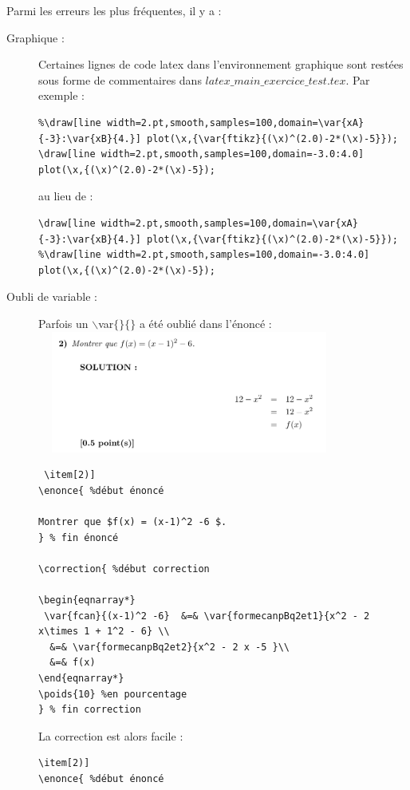 {Parmi les erreurs les plus fréquentes, il y a :

\begin{description}
 \item[Graphique : ] Certaines lignes de code latex dans l'environnement graphique sont restées sous forme de commentaires dans 
 {\bf $latex\_main\_exercice\_test.tex$}. Par exemple :
  \begin{verbatim}
%\draw[line width=2.pt,smooth,samples=100,domain=\var{xA}{-3}:\var{xB}{4.}] plot(\x,{\var{ftikz}{(\x)^(2.0)-2*(\x)-5}});
\draw[line width=2.pt,smooth,samples=100,domain=-3.0:4.0] plot(\x,{(\x)^(2.0)-2*(\x)-5});
 \end{verbatim}
 au lieu de : 
 \begin{verbatim}
\draw[line width=2.pt,smooth,samples=100,domain=\var{xA}{-3}:\var{xB}{4.}] plot(\x,{\var{ftikz}{(\x)^(2.0)-2*(\x)-5}});
%\draw[line width=2.pt,smooth,samples=100,domain=-3.0:4.0] plot(\x,{(\x)^(2.0)-2*(\x)-5});
 \end{verbatim}
\item[Oubli de variable : ] Parfois un  $\backslash$var$\{\}\{\}$ a été oublié dans l'énoncé : \\
 \includegraphics[width=10cm,height=4cm]{./images/creation_exercice_solve_erreur_01.png}
\begin{verbatim}
 \item[2)] 
\enonce{ %début énoncé 

Montrer que $f(x) = (x-1)^2 -6 $. 
} % fin énoncé 

\correction{ %début correction 

\begin{eqnarray*}
 \var{fcan}{(x-1)^2 -6}  &=& \var{formecanpBq2et1}{x^2 - 2 x\times 1 + 1^2 - 6} \\
  &=& \var{formecanpBq2et2}{x^2 - 2 x -5 }\\
  &=& f(x) 
\end{eqnarray*}
\poids{10} %en pourcentage
} % fin correction 

\end{verbatim}
La correction est alors facile : 
\begin{verbatim}
\item[2)] 
\enonce{ %début énoncé 


\end{verbatim}
\end{description}}
